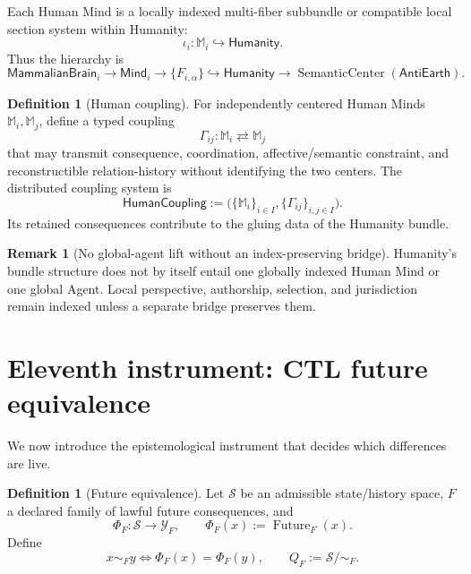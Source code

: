 \documentclass[10pt]{article}
\theoremstyle{pe}
\theoremstyle{definition}
\newtheorem{definition}[theorem]{Definition}
\newtheorem{remark}[theorem]{Remark}
\newcommand{\Future}{\operatorname{Future}}
\newcommand{\SC}{\operatorname{SemanticCenter}}
\newcommand{\Mind}{\mathsf{Mind}}
\newcommand{\Brain}{\mathsf{MammalianBrain}}
\newcommand{\Humanity}{\mathsf{Humanity}}
\newcommand{\AntiEarth}{\mathsf{AntiEarth}}
\newcommand{\HumanCoupling}{\mathsf{HumanCoupling}}
\begin{document}
Each Human Mind is a locally indexed multi-fiber subbundle or compatible local section system within Humanity:
\[
  \iota_i:\mathbb M_i\hookrightarrow\Humanity.
\]
Thus the hierarchy is
\[
  \boxed{
  \Brain_i
  \to
  \Mind_i
  \to
  \{F_{i,\alpha}\}
  \hookrightarrow
  \Humanity
  \to
  \SC(\AntiEarth).
  }
\]

\begin{definition}[Human coupling]
For independently centered Human Minds \(\mathbb M_i,\mathbb M_j\), define a typed coupling
\[
  \Gamma_{ij}:
  \mathbb M_i
  \rightleftarrows
  \mathbb M_j
\]
that may transmit consequence, coordination, affective/semantic constraint, and reconstructible relation-history without identifying the two centers.  The distributed coupling system is
\begin{equation}\label{eq:human-coupling}
  \boxed{
  \HumanCoupling
  :=
  \bigl(\{\mathbb M_i\}_{i\in I},\{\Gamma_{ij}\}_{i,j\in I}\bigr).
  }
\end{equation}
Its retained consequences contribute to the gluing data of the Humanity bundle.
\end{definition}

\begin{remark}[No global-agent lift without an index-preserving bridge]
Humanity's bundle structure does not by itself entail one globally indexed Human Mind or one global Agent.  Local perspective, authorship, selection, and jurisdiction remain indexed unless a separate bridge preserves them.
\end{remark}

\section{Eleventh instrument: CTL future equivalence}

We now introduce the epistemological instrument that decides which differences are live.

\begin{definition}[Future equivalence]
Let \(\mathcal S\) be an admissible state/history space, \(F\) a declared family of lawful future consequences, and
\[
  \Phi_F:\mathcal S\to\mathcal Y_F,
  \qquad
  \Phi_F(x):=\Future_F(x).
\]
Define
\begin{equation}\label{eq:future-equivalence}
  x\sim_Fy
  \iff
  \Phi_F(x)=\Phi_F(y),
  \qquad
  Q_F:=\mathcal S/\!\sim_F.
\end{equation}
\end{definition}
\end{document}
